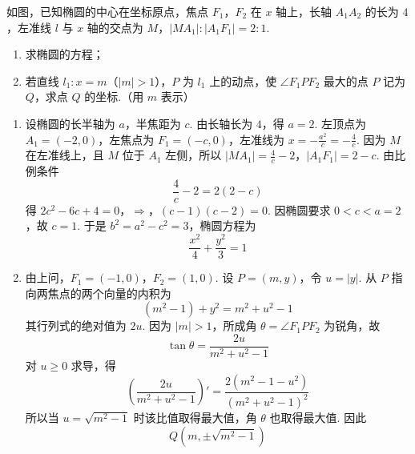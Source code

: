 \begin{problem}
如图，已知椭圆的中心在坐标原点，焦点 \(F_{1}\)，\(F_{2}\) 在 \(x\) 轴上，长轴 \(A_{1}A_{2}\) 的长为 \(4\)，左准线 \(l\) 与 \(x\) 轴的交点为 \(M\)，\(|MA_{1}|: |A_{1}F_{1}| = 2:1\).
\begin{enumerate}
\item 求椭圆的方程；
\item 若直线 \(l_{1}: x = m\)（\(|m| > 1\)），\(P\) 为 \(l_{1}\) 上的动点，使 \(\angle F_{1}PF_{2}\) 最大的点 \(P\) 记为 \(Q\)，求点 \(Q\) 的坐标.（用 \(m\) 表示）
\end{enumerate}


\begin{solution}
\begin{enumerate}
\item 设椭圆的长半轴为 \(a\)，半焦距为 \(c\). 由长轴长为 \(4\)，得 \(a=2\). 左顶点为 \(A_1=(-2,0)\)，左焦点为 \(F_1=(-c,0)\)，左准线为 \(x=-\frac{a^2}{c}=-\frac4c\). 因为 \(M\) 在左准线上，且 \(M\) 位于 \(A_1\) 左侧，所以
\(|MA_1|=\frac4c-2\)，\(|A_1F_1|=2-c\).
由比例条件
\[
\frac4c-2=2(2-c)
\]
得
\(2c^2-6c+4=0\)，\(\Longrightarrow\)，\((c-1)(c-2)=0\).
因椭圆要求 \(0<c<a=2\)，故 \(c=1\). 于是
\(b^2=a^2-c^2=3\)，椭圆方程为
\[
\frac{x^2}{4}+\frac{y^2}{3}=1
\]

\item 由上问，\(F_1=(-1,0)\)，\(F_2=(1,0)\). 设 \(P=(m,y)\)，令 \(u=|y|\). 从 \(P\) 指向两焦点的两个向量的内积为
\[
(m^2-1)+y^2=m^2+u^2-1
\]
其行列式的绝对值为 \(2u\). 因为 \(|m|>1\)，所成角 \(\theta=\angle F_1PF_2\) 为锐角，故
\[
\tan\theta=\frac{2u}{m^2+u^2-1}
\]
对 \(u\geqslant0\) 求导，得
\[
\left(\frac{2u}{m^2+u^2-1}\right)'
=\frac{2(m^2-1-u^2)}{(m^2+u^2-1)^2}
\]
所以当 \(u=\sqrt{m^2-1}\) 时该比值取得最大值，角 \(\theta\) 也取得最大值. 因此
\[
Q\left(m,\pm\sqrt{m^2-1}\right)
\]
\end{enumerate}
\end{solution}
\end{problem}

